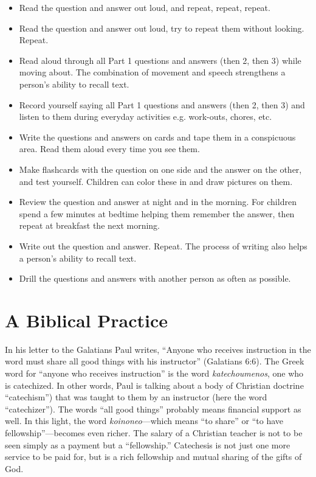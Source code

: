 \documentclass[]{memoir}
\begin{document}
\begin{itemize}
	\item Read the question and answer out loud, and repeat, repeat, repeat.
	\item Read the question and answer out loud, try to repeat them without looking. Repeat.
	\item Read aloud through all Part 1 questions and answers (then 2, then 3) while moving about. The combination of movement and speech strengthens a person's ability to recall text.
	\item Record yourself saying all Part 1 questions and answers (then 2, then 3) and listen to them during everyday activities e.g. work-outs, chores, etc.
	\item Write the questions and answers on cards and tape them in a conspicuous area. Read them aloud every time you see them.
	\item Make flashcards with the question on one side and the answer on the other, and test yourself. Children can color these in and draw pictures on them.
	\item Review the question and answer at night and in the morning. For children spend a few minutes at bedtime helping them remember the answer, then repeat at breakfast the next morning.
	\item Write out the question and answer. Repeat. The process of writing also helps a person's ability to recall text.
	\item Drill the questions and answers with another person as often as possible.
\end{itemize}  

\section{A Biblical Practice}
In his letter to the Galatians Paul writes, ``Anyone who receives instruction in the word must share all good things with his instructor'' (Galatians 6:6). The Greek word for ``anyone who receives instruction'' is the word \emph{katechoumenos}, one who is catechized. In other words, Paul is talking about a body of Christian doctrine ``catechism'') that was taught to them by an instructor (here the word ``catechizer''). The words ``all good things'' probably means financial support as well. In this light, the word \emph{koinoneo}\thinspace{}---\thinspace{}which means ``to share'' or ``to have fellowship''\thinspace{}---\thinspace{}becomes even richer. The salary of a Christian teacher is not to be seen simply as a payment but a ``fellowship.'' Catechesis is not just one more service to be paid for, but is a rich fellowship and mutual sharing of the gifts of God.
\end{document}

